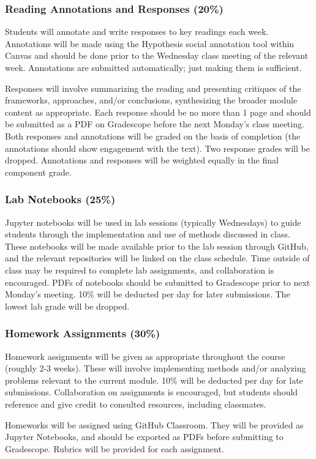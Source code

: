 \documentclass[12pt,a4paper]{article}
\begin{document}
\subsubsection{Reading Annotations and Responses (20\%)}
Students will annotate and write responses to key readings each week. Annotations will be made using the Hypothesis social annotation tool within Canvas and should be done prior to the Wednesday class meeting of the relevant week. Annotations are submitted automatically; just making them is sufficient.

Responses will involve summarizing the reading and presenting critiques of the frameworks, approaches, and/or conclusions, synthesizing the broader module content as appropriate. Each response should be no more than 1 page and should be submitted as a PDF on Gradescope before the next Monday's class meeting. Both responses and annotations will be graded on the basis of completion (the annotations should show engagement with the text). Two response grades will be dropped. Annotations and responses will be weighted equally in the final component grade.

\subsubsection{Lab Notebooks (25\%)}
Jupyter notebooks will be used in lab sessions (typically Wednesdays) to guide students through the implementation and use of methods discussed in class. These notebooks will be made available prior to the lab session through GitHub, and the relevant repositories will be linked on the class schedule. Time outside of class may be required to complete lab assignments, and collaboration is encouraged. PDFs of notebooks should be submitted to Gradescope prior to next Monday's meeting. 10\% will be deducted per day for later submissions. The lowest lab grade will be dropped.

\subsubsection{Homework Assignments (30\%)}
Homework assignments will be given as appropriate throughout the course (roughly 2-3 weeks). These will involve implementing methods and/or analyzing problems relevant to the current module. 10\% will be deducted per day for late submissions. Collaboration on assignments is encouraged, but students should reference and give credit to consulted resources, including classmates.

Homeworks will be assigned using GitHub Classroom. They will be provided as Jupyter Notebooks, and should be exported as PDFs before submitting to Gradescope. Rubrics will be provided for each assignment. 
\end{document}
